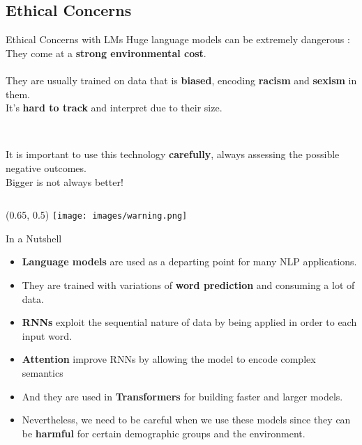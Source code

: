 \documentclass[UKenglish]{beamer}
\begin{document}
\subsection{Ethical Concerns}
\begin{frame}{Ethical Concerns with LMs}
Huge language models can be extremely dangerous \cite{parrot}:\\ They come at a \textbf{strong environmental cost}. \\
\\ They are usually trained on data that is \textbf{biased}, encoding \textbf{racism} and \textbf{sexism} in them.\\
It's \textbf{hard to track} and interpret due to their size.
\begin{columns}[onlytextwidth]
    \begin{column}{0.60\textwidth}
    \vspace{0.1cm}\\
    It is important to use this technology \textbf{carefully}, always assessing the possible negative outcomes. 
    \\Bigger is not always better!
    \end{column}
\end{columns}
\begin{textblock}{0.5}(0.65, 0.5)
        \texttt{[image: images/warning.png]}
\end{textblock}
\end{frame}
\begin{frame}{In a Nutshell}
    \begin{itemize}
        \item \textbf{Language models} are used as a departing point for many NLP applications.
        \item They are trained with variations of \textbf{word prediction} and consuming a lot of data.
        \item \textbf{RNNs} exploit the sequential nature of data by being applied in order to each input word.
        \item \textbf{Attention} improve RNNs by allowing the model to encode complex semantics
        \item And they are used in \textbf{Transformers} for building faster and larger models.
        \item Nevertheless, we need to be careful when we use these models since they can be \textbf{harmful} for certain demographic groups and the environment.
    \end{itemize}
\end{frame}
\end{document}
